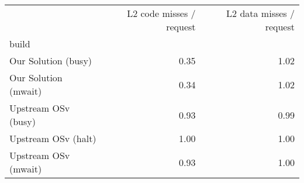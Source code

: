 \begin{tabular}{lrr}
\toprule
{} &  L2 code misses / request &  L2 data misses / request \\
build                &                           &                           \\
\midrule
Our Solution (busy)  &                      0.35 &                      1.02 \\
Our Solution (mwait) &                      0.34 &                      1.02 \\
Upstream OSv (busy)  &                      0.93 &                      0.99 \\
Upstream OSv (halt)  &                      1.00 &                      1.00 \\
Upstream OSv (mwait) &                      0.93 &                      1.00 \\
\bottomrule
\end{tabular}
